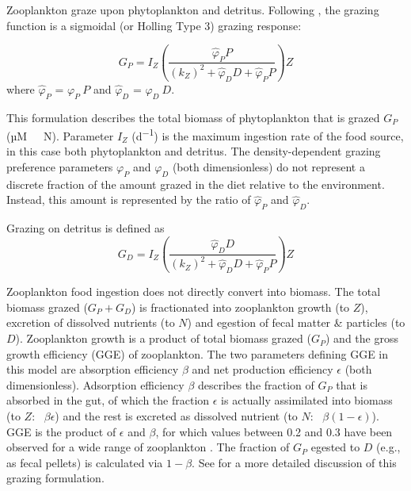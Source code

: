 \documentclass[gmd, manuscript]{copernicus}
\begin{document}
Zooplankton graze upon phytoplankton and detritus. Following \citet{Anderson2015c}, the grazing function is a sigmoidal (or Holling Type 3) grazing response:


\begin{equation}
    G_P = I_Z \left( \frac{ \hat{\varphi}_P P}{(k_Z)^2 + \hat{\varphi}_D D +\hat{\varphi}_P P}  \right) Z
\end{equation}
where $\hat{\varphi}_P$ = $\varphi_P \ P$ and $\hat{\varphi}_D$ = $\varphi_D \ D$.

This formulation describes the total biomass of phytoplankton that is grazed $G_P$ (\unit{µM \ N}). Parameter $I_Z$ (\unit{d^{-1}}) is the maximum ingestion rate of the food source, in this case both phytoplankton and detritus. The density-dependent grazing preference parameters $\varphi_P$ and $\varphi_D$ (both dimensionless) do not represent a discrete fraction of the amount grazed in the diet relative to the environment. Instead, this amount is represented by the ratio of $\hat{\varphi}_P$ and $\hat{\varphi}_D$.

Grazing on detritus is defined as
\begin{equation}
    G_D = I_Z \left( \frac{ \hat{\varphi}_D D}{(k_Z)^2 + \hat{\varphi}_D D +\hat{\varphi}_P P}  \right) Z
\end{equation}

Zooplankton food ingestion does not directly convert into biomass. The total biomass grazed ($G_P + G_D$) is fractionated into zooplankton growth (to $Z$), excretion of dissolved nutrients (to $N$) and egestion of fecal matter \& particles (to $D$). Zooplankton growth is a product of total biomass grazed ($G_P$) and the gross growth efficiency (GGE) of zooplankton. The two parameters defining GGE in this model are absorption efficiency $\beta$ and net production efficiency $\epsilon$ (both dimensionless). Adsorption efficiency $\beta$ describes the fraction of $G_P$ that is absorbed in the gut, of which the fraction $\epsilon$ is actually assimilated into biomass (to $Z$: \ $\beta \epsilon$) and the rest is excreted as dissolved nutrient (to $N$: \ $\beta (1-\epsilon)$). GGE is the product of $\epsilon$ and $\beta$, for which values between 0.2 and 0.3 have been observed for a wide range of zooplankton \citep{Straile1997GrossGroup}. The fraction of $G_P$ egested to $D$ (e.g., as fecal pellets) is calculated via $1-\beta$. See \citet{Anderson2015c} for a more detailed discussion of this grazing formulation.
\end{document}
